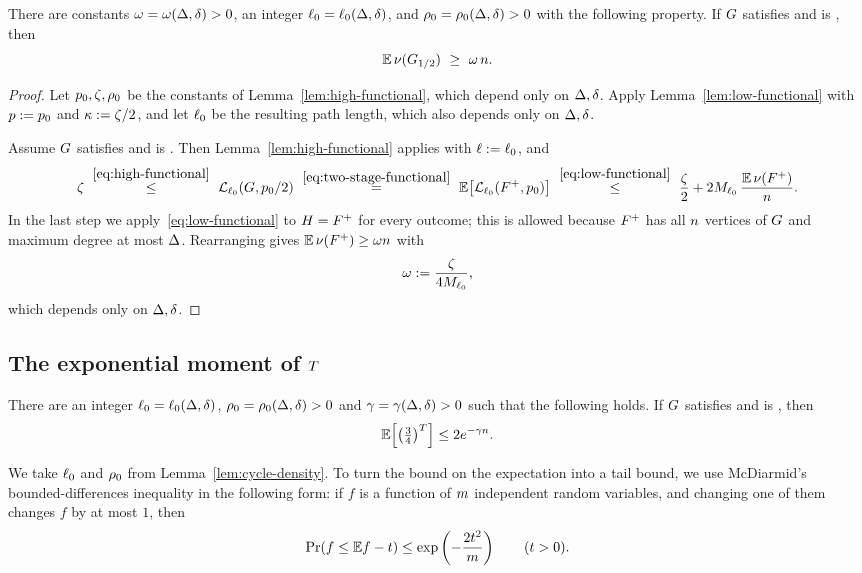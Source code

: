 \begin{lemma}\label{lem:cycle-density}
There are constants \(\omega=\omega(\Delta,\delta)>0\), an integer
\(\ell_0=\ell_0(\Delta,\delta)\), and \(\rho_0=\rho_0(\Delta,\delta)>0\) with
the following property. If \(G\) satisfies \Hyp{} and is
\loctree{\plenz}{\nontreez}, then
\[
  \mathbb{E}\,\nu(G_{1/2})\ \ge\ \omega\,n .
\]
\end{lemma}

\begin{proof}
Let \(p_0,\zeta,\rho_0\) be the constants of
Lemma~\ref{lem:high-functional}, which depend only on \(\Delta,\delta\). Apply
Lemma~\ref{lem:low-functional} with \(p:=p_0\) and \(\kappa:=\zeta/2\),
and let \(\ell_0\) be the resulting path length, which also depends only on
\(\Delta,\delta\).

Assume \(G\) satisfies \Hyp{} and is \loctree{\plenz}{\nontreez}. Then
Lemma~\ref{lem:high-functional} applies with \(\ell:=\ell_0\), and
\[
  \plow
  \ \overset{\eqref{eq:high-functional}}{\le}\
  \Lpath{\plenz}{\Gin}{\keeppz/2}
  \ \overset{\eqref{eq:two-stage-functional}}{=}\
  \Ex{\Lpath{\plenz}{\Akept}{\keeppz}}
  \ \overset{\eqref{eq:low-functional}}{\le}\
  \frac{\plow}{2}+2\ballsz{\plenz}\,\frac{\E\,\cyc{\Akept}}{\nvert} .
\]
In the last step we apply~\eqref{eq:low-functional} to \(H={F^{+}}\) for every
outcome; this is allowed because \({F^{+}}\) has all \(n\) vertices of
\(G\) and maximum degree at most \(\Delta\).
Rearranging gives \(\mathbb{E}\,\nu({F^{+}})\ge\omega n\) with
\[
  \omega:=\frac{\zeta}{4M_{\ell_0}} ,
\]
which depends only on \(\Delta,\delta\).
\end{proof}

\subsection{The exponential moment of \texorpdfstring{\(T\)}{T}}

\begin{Tboundrestatement}
There are an integer \(\ell_0=\ell_0(\Delta,\delta)\),
\(\rho_0=\rho_0(\Delta,\delta)>0\) and \(\gamma=\gamma(\Delta,\delta)>0\) such
that the following holds. If \(G\) satisfies \Hyp{} and is
\loctree{\plenz}{\nontreez}, then
\[
  \Ex{\left(\tfrac34\right)^{\Tdef}}\le 2e^{-\rate\nvert} .
\]
\end{Tboundrestatement}

We take \(\ell_0\) and \(\rho_0\) from Lemma~\ref{lem:cycle-density}. To
turn the bound on the expectation into a tail bound, we use McDiarmid's
bounded-differences inequality in the following form: if \(f\) is a function of
\(m\) independent random variables, and changing one of them changes \(f\)
by at most \(1\), then
\[
  \Prx{f\le\E f-t}\le\exp\left(-\frac{2t^2}{\medge}\right)
  \qquad(t>0).
\]

